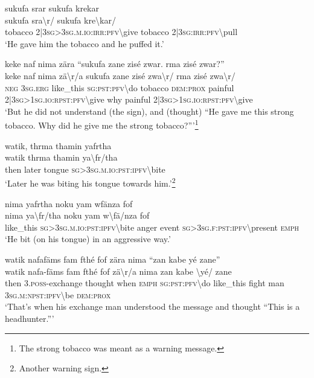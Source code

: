 \ea\label{ex:5:a1505}
sukufa srar sukufa krekar\\
\gll sukufa	sra{\textbackslash}r/	sukufa	kre{\textbackslash}kar/\\
     tobacco	2|3\textsc{sg}>3\textsc{sg}.\textsc{m}.\textsc{io}:\textsc{irr}:\textsc{pfv}{\textbackslash}give	tobacco	2|3\textsc{sg}:\textsc{irr}:\textsc{pfv}{\textbackslash}pull\\
\glt `He gave him the tobacco and he puffed it.'
\z

\ea\label{ex:5:a1506}
keke naf nima zära ``sukufa zane zisé zwar. rma zisé zwar?''\\
\gll keke	naf	nima	zä{\textbackslash}r/a	sukufa	zane	zisé	zwa{\textbackslash}r/	rma	zisé	zwa{\textbackslash}r/\\
     \textsc{neg}	3\textsc{sg}.\textsc{erg}	like\_this	\textsc{sg}:\textsc{pst}:\textsc{pfv}{\textbackslash}do	tobacco	\textsc{dem}:\textsc{prox}	painful	2|3\textsc{sg}>1\textsc{sg}.\textsc{io}:\textsc{rpst}:\textsc{pfv}{\textbackslash}give	why	painful	2|3\textsc{sg}>1\textsc{sg}.\textsc{io}:\textsc{rpst}:\textsc{pfv}{\textbackslash}give\\
\glt `But he did not understand (the sign), and (thought) ``He gave me this strong tobacco. Why did he give me the strong tobacco?'''\footnote{The strong tobacco was meant as a warning message.}
\z

\ea\label{ex:5:a1508}
watik, thrma thamin yafrtha\\
\gll watik	thrma	thamin	ya{\textbackslash}fr/tha\\
     then	later	tongue	\textsc{sg}>3\textsc{sg}.\textsc{m}.\textsc{io}:\textsc{pst}:\textsc{ipfv}{\textbackslash}bite\\
\glt `Later he was biting his tongue towards him.'\footnote{Another warning sign.}
\z

\ea\label{ex:5:a1510}
nima yafrtha noku yam wfänza fof\\
\gll nima	ya{\textbackslash}fr/tha	noku	yam	w{\textbackslash}fä/nza	fof\\
     like\_this	\textsc{sg}>3\textsc{sg}.\textsc{m}.\textsc{io}:\textsc{pst}:\textsc{ipfv}{\textbackslash}bite	anger	event	\textsc{sg}>3\textsc{sg}.\textsc{f}:\textsc{pst}:\textsc{ipfv}{\textbackslash}present	\textsc{emph}\\
\glt `He bit (on his tongue) in an aggressive way.'
\z

\ea\label{ex:5:a1513}
watik nafafäms fam fthé fof zära nima ``zan kabe yé zane''\\
\gll watik	nafa-fäms	fam	fthé	fof	zä{\textbackslash}r/a	nima	zan	kabe	{\textbackslash}yé/	zane\\
     then	3.\textsc{poss}-exchange	thought	when	\textsc{emph}	\textsc{sg}:\textsc{pst}:\textsc{pfv}{\textbackslash}do	like\_this	fight	man	3\textsc{sg}.\textsc{m}:\textsc{npst}:\textsc{ipfv}{\textbackslash}be	\textsc{dem}:\textsc{prox}\\
\glt `That's when his exchange man understood the message and thought ``This is a headhunter.'''
\z


